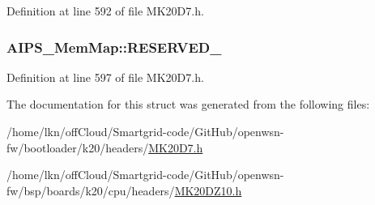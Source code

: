 Definition at line 592 of file M\+K20\+D7.\+h.

\subsubsection[{\texorpdfstring{R\+E\+S\+E\+R\+V\+E\+D\+\_\+1}{RESERVED_1}}]{ A\+I\+P\+S\+\_\+\+Mem\+Map\+::\+R\+E\+S\+E\+R\+V\+E\+D\+\_}\hypertarget{struct_a_i_p_s___mem_map_a2cfc1f79520a66cb581e575c8606fd3b}{}\label{struct_a_i_p_s___mem_map_a2cfc1f79520a66cb581e575c8606fd3b}


Definition at line 597 of file M\+K20\+D7.\+h.



The documentation for this struct was generated from the following files\+:\begin{DoxyCompactItemize}
\item 
/home/lkn/off\+Cloud/\+Smartgrid-\/code/\+Git\+Hub/openwsn-\/fw/bootloader/k20/headers/\hyperlink{bootloader_2k20_2headers_2_m_k20_d7_8h}{M\+K20\+D7.\+h}\item 
/home/lkn/off\+Cloud/\+Smartgrid-\/code/\+Git\+Hub/openwsn-\/fw/bsp/boards/k20/cpu/headers/\hyperlink{_m_k20_d_z10_8h}{M\+K20\+D\+Z10.\+h}\end{DoxyCompactItemize}
